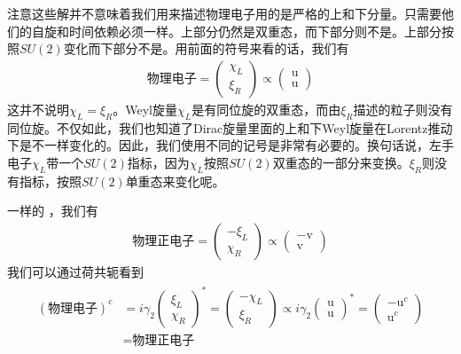 注意这些解并不意味着我们用来描述物理电子用的是严格的上和下分量。只需要他们的自旋和时间依赖必须一样。上部分仍然是双重态，而下部分则不是。上部分按照$SU(2)$变化而下部分不是。用前面的符号来看的话，我们有
\begin{align}
\text{物理电子}=\left(\begin{matrix}\chi_L\\\xi_R\end{matrix}\right)\propto\left(\begin{matrix}\text{u}\\\text{u}\end{matrix}\right)
\end{align}
这并不说明$\chi_L=\xi_R$。Weyl旋量$\chi_L$是有同位旋的双重态，而由$\xi_R$描述的粒子则没有同位旋。不仅如此，我们也知道了Dirac旋量里面的上和下Weyl旋量在Lorentz推动下是不一样变化的。因此，我们使用不同的记号是非常有必要的。换句话说，左手电子$\chi_L$带一个$SU(2)$指标，因为$\chi_L$按照$SU(2)$双重态的一部分来变换。$\xi_R$则没有指标，按照$SU(2)$单重态来变化呢。

一样的 ，我们有
\begin{align}
\text{物理正电子}=\left(\begin{matrix}-\xi_L\\\chi_R\end{matrix}\right)\propto\left(\begin{matrix}-\text{v}\\\text{v}\end{matrix}\right)
\end{align}
我们可以通过荷共轭看到
\begin{align}
\begin{split}
(\text{物理电子})^c&=i\gamma_2\left(\begin{matrix}\xi_L\\\chi_R\end{matrix}\right)^*=\left(\begin{matrix}-\chi_L\\\xi_R\end{matrix}\right)\propto i\gamma_2\left(\begin{matrix}\text{u}\\\text{u}\end{matrix}\right)^*=\left(\begin{matrix}-\text{u}^c\\\text{u}^c\end{matrix}\right)\\
&=\text{物理正电子}
\end{split}
\end{align}

